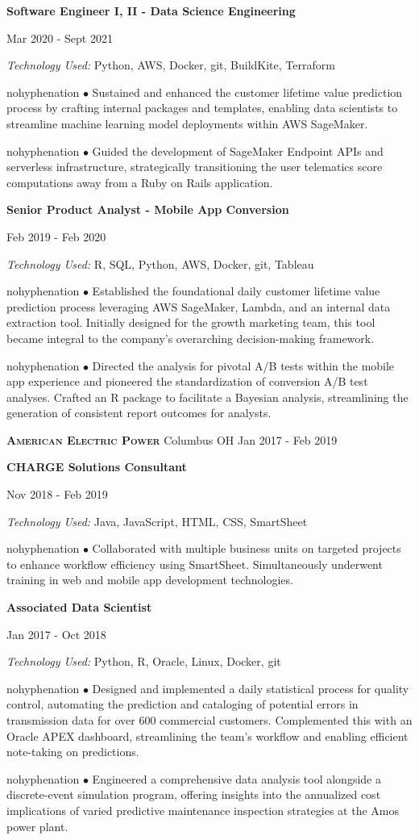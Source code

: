 \documentclass[12pt]{article}
\newcommand{\tab}[1][1cm]{\hspace*{#1}}
\newcommand{\company}[4]{
    \textsc{\textbf{#1}} \tab \small {#2} \hfill \small {#3 {-} #4} \\
    \medskip
}
\newcommand{\position}[4]{
    \tab[0.5cm] \textbf{#1} \hfill {\footnotesize #2 {-} #3 \par}
    \tab[1cm] \textit{Technology Used:} #4 \\
    \vspace*{0.5mm}
}
\newcommand{\bulletpoint}[1]{
  \begin{hyphenrules}{nohyphenation}
  	\hangindent=1.5cm \rightskip=2.35cm \tab[1.1cm] $\bullet$#1 \\
  \end{hyphenrules}
  \medskip
}
\begin{document}
\begin{flushleft}
    \medskip

    \position{Software Engineer I, II - Data Science Engineering}{Mar 2020}{Sept 2021}{Python, AWS, Docker, git, BuildKite, Terraform}
    \bulletpoint{
	Sustained and enhanced the customer lifetime value prediction process by crafting internal
	packages and templates, enabling data scientists to streamline machine learning model
	deployments within AWS SageMaker.
    }
    \bulletpoint{
    	Guided the development of SageMaker Endpoint APIs and serverless infrastructure,
	strategically transitioning the user telematics score computations away from a Ruby on Rails application.
    }

    \medskip

    \position{Senior Product Analyst - Mobile App Conversion}{Feb 2019}{Feb 2020}{R, SQL, Python, AWS, Docker, git, Tableau}
    \bulletpoint{
	Established the foundational daily customer lifetime value prediction process leveraging AWS
	SageMaker, Lambda, and an internal data extraction tool. Initially designed for the growth marketing
	team, this tool became integral to the company's overarching decision-making framework.
    }
    \bulletpoint{
	Directed the analysis for pivotal A/B tests within the mobile app experience and pioneered
	the standardization of conversion A/B test analyses. Crafted an R package to facilitate a Bayesian
	analysis, streamlining the generation of consistent report outcomes for analysts.
    }

    \medskip


    \company{American Electric Power}{Columbus OH}{Jan 2017}{Feb 2019}
    
    \position{CHARGE Solutions Consultant}{Nov 2018}{Feb 2019}{Java, JavaScript, HTML, CSS, SmartSheet}
    \bulletpoint{
	Collaborated with multiple business units on targeted projects to enhance workflow efficiency
	using SmartSheet. Simultaneously underwent training in web and mobile app development technologies.
    }
    \medskip

    \position{Associated Data Scientist}{Jan 2017}{Oct 2018}{Python, R, Oracle, Linux, Docker, git}
    \bulletpoint{
    	Designed and implemented a daily statistical process for quality control, automating the prediction
	and cataloging of potential errors in transmission data for over 600 commercial customers.
	Complemented this with an Oracle APEX dashboard, streamlining the team's workflow and
	enabling efficient note-taking on predictions.
    }
    \bulletpoint{
    	Engineered a comprehensive data analysis tool alongside a discrete-event simulation program,
	offering insights into the annualized cost implications of varied predictive maintenance inspection
	strategies at the Amos power plant.
    }
    \medskip
  \end{flushleft}
  
\end{document}
